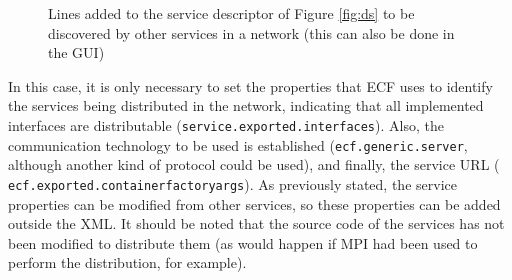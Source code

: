\begin{figure}
\usebox{\mintedboxServer}
\caption{Lines added to the service descriptor of Figure \ref{fig:ds} to be discovered by other services in a network  (this can also be done in the GUI)} 
\label{fig:remote} %
\end{figure}

In this case, it is only necessary to set the properties that ECF uses
to identify the services being distributed in the network, indicating
that all implemented interfaces are distributable
(\texttt{ser\-vi\-ce\-.ex\-por\-ted\-.in\-ter\-fa\-ces}). Also, the
communication technology to be used is established
(\texttt{ecf\-.ge\-ne\-ric\-.ser\-ver}, although another kind of
protocol could be used), and finally, the service URL (\texttt{
  ecf\-.ex\-por\-ted\-.con\-tai\-ner\-fac\-to\-ry\-args}). As
previously stated, the service properties can be modified from other
services, so these properties  %
can be added outside the XML. It should be noted that the source code
of the services has not been modified to distribute them (as would
happen if MPI had been used to perform the distribution, for
example). %











